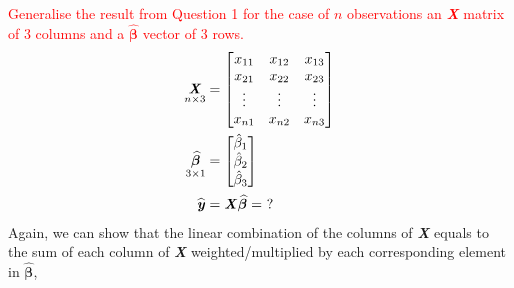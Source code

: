 \documentclass[12pt]{report}
\begin{document}
\noindent \textcolor{red}{Generalise the result from Question 1 for the case of $n$ observations an \textbf{\textit{X}} matrix of 3 columns and a $\widehat{\boldsymbol{\beta}}$ vector of 3 rows.}
\begin{align*}
	\underset{n\times3}{\textbf{\textit{X}}}
	&=
	\begin{bmatrix}
	x_{11} & x_{12} & x_{13} \\
	x_{21} & x_{22} & x_{23} \\
	\vdots & \vdots & \vdots \\
	x_{n1} & x_{n2} & x_{n3} 
	\end{bmatrix} \\
	\underset{3\times1}{\widehat{\boldsymbol{\beta}}}
	&=
	\begin{bmatrix}
	\hat{\beta}_1 \\
	\hat{\beta}_2 \\
	\hat{\beta}_3 
	\end{bmatrix} \\
	\widehat{\textbf{\textit{y}}}
	&=
	{\textbf{\textit{X}}\widehat{\boldsymbol{\beta}}}
	=\ ?
\end{align*}
\justify 
Again, we can show that the linear combination of the columns of \textbf{\textit{X}} equals to the sum of each column of \textbf{\textit{X}} weighted/multiplied by each corresponding element in $\widehat{\boldsymbol{\beta}}$,
\end{document}
